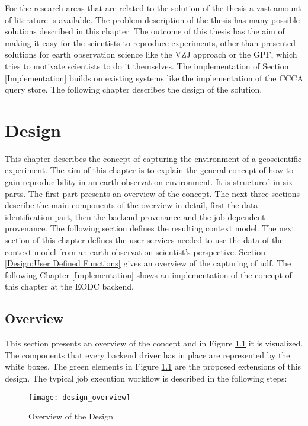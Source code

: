 \documentclass[draft,final]{vutinfth} %
\begin{document}
For the research areas that are related to the solution of the thesis a vast amount of literature is available. The problem description of the thesis has many possible solutions described in this chapter. The outcome of this thesis has the aim of making it easy for the scientists to reproduce experiments, other than presented solutions for earth observation science like the VZJ approach or the GPF, which tries to motivate scientists to do it themselves. The implementation of Section \ref{Implementation} builds on existing systems like the implementation of the CCCA query store. The following chapter describes the design of the solution. 




 
\chapter{Design}\label{Design}
This chapter describes the concept of capturing the environment of a geoscientific experiment. The aim of this chapter is to explain the general concept of how to gain reproducibility in an earth observation environment. It is structured in six parts. The first part presents an overview of the concept. The next three sections describe the main components of the overview in detail, first the data identification part, then the backend provenance and the job dependent provenance. The following section defines the resulting context model. The next section of this chapter defines the user services needed to use the data of the context model from an earth observation scientist's perspective. Section \ref{Design:User Defined Functions} gives an overview of the capturing of \gls{udf}. The following Chapter \ref{Implementation} shows an implementation of the concept of this chapter at the EODC backend. 



\section{Overview}\label{Design:Overview}
This section presents an overview of the concept and in Figure \ref{fig:overview} it is visualized. The components that every backend driver has in place are represented by the white boxes. The green elements in Figure \ref{fig:overview} are the proposed extensions of this design. The typical job execution workflow is described in the following steps:

\begin{figure}[h]
	\centering
	\texttt{[image: design\_overview]}
	\caption{Overview of the Design}
	\label{fig:overview} 
\end{figure}
\end{document}
